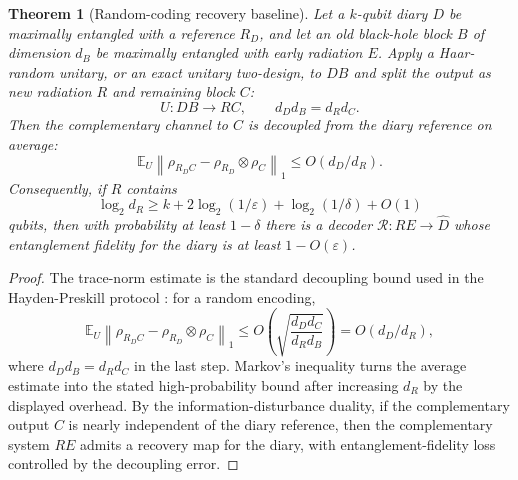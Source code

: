 \documentclass[11pt]{article}
\newtheorem{theorem}{Theorem}
\newcommand{\cR}{\mathcal R}
\begin{document}
\begin{theorem}[Random-coding recovery baseline]
\label{thm:random-recovery}
Let a $k$-qubit diary $D$ be maximally entangled with a reference
$R_D$, and let an old black-hole block $B$ of dimension $d_B$ be
maximally entangled with early radiation $E$.  Apply a Haar-random
unitary, or an exact unitary two-design, to $DB$ and split the output as
new radiation $R$ and remaining block $C$:
\begin{equation}
  U: D B \longrightarrow R C,
  \qquad
  d_D d_B = d_R d_C .
\end{equation}
Then the complementary channel to $C$ is decoupled from the diary
reference on average:
\begin{equation}
  \mathbb E_U
  \left\|
  \rho_{R_D C}
  -
  \rho_{R_D}\otimes\rho_C
  \right\|_1
  \le
  O(d_D/d_R).
\end{equation}
Consequently, if $R$ contains
\begin{equation}
  \log_2 d_R
  \ge
  k+2\log_2(1/\varepsilon)+\log_2(1/\delta)+O(1)
\end{equation}
qubits, then with probability at least $1-\delta$ there is a decoder
$\cR:RE\to \widehat D$ whose entanglement fidelity for the diary is at
least $1-O(\varepsilon)$.
\end{theorem}

\begin{proof}
The trace-norm estimate is the standard decoupling bound used in the
Hayden-Preskill protocol \citep{Hayden2007BlackHoles,Dupuis2014OneShot}:
for a random encoding,
\begin{equation}
  \mathbb E_U
  \left\|
  \rho_{R_D C}
  -
  \rho_{R_D}\otimes\rho_C
  \right\|_1
  \le
  O\!\left(
  \sqrt{\frac{d_D d_C}{d_R d_B}}
  \right)
  =
  O(d_D/d_R),
\end{equation}
where $d_Dd_B=d_Rd_C$ in the last step.  Markov's inequality turns the
average estimate into the stated high-probability bound after increasing
$d_R$ by the displayed overhead.  By the information-disturbance
duality, if the complementary output $C$ is nearly independent of the
diary reference, then the complementary system $RE$ admits a recovery map
for the diary, with entanglement-fidelity loss controlled by the
decoupling error.
\end{proof}
\end{document}
